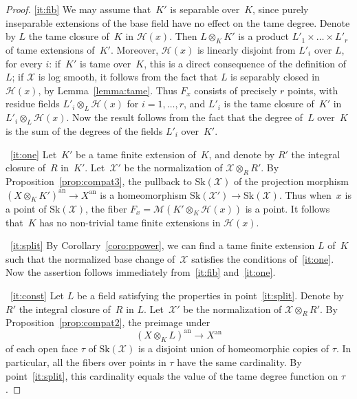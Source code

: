 \documentclass[JEP,XML,SOM,Unicode,NoFloatCountersInSection]{cedram}
\let\mathcal\mathscr
\theoremstyle{definition}
\numberwithin{equation}{subsection}
\newcommand{\cX}{\ensuremath{\mathscr{X}}}
\newcommand{\an}{\mathrm{an}}
\newcommand{\Sk}{\mathrm{Sk}}
\newcommand{\tdeg}{\mathrm{tdeg}}
\begin{document}
\skpt
\begin{proof}
\eqref{it:fib} We may assume that~$K'$ is separable over~$K$, since purely inseparable extensions of the base field have no effect on the tame degree.
Denote by $L$ the tame closure of~$K$ in $\mathscr{H}(x)$. Then $L\otimes_K K'$ is a product $L'_1\times \ldots \times L'_r$ of tame extensions of~$K'$.
Moreover, $\mathscr{H}(x)$ is linearly disjoint from $L'_i$ over $L$, for every $i$: if~$K'$ is tame over~$K$, this is a direct consequence of the definition of $L$; if
$\cX$ is log smooth, it follows from the fact that $L$ is separably closed in $\mathscr{H}(x)$, by Lemma~\ref{lemma:tame}.
Thus $F_x$ consists of precisely $r$ points, with residue fields $L'_i\otimes_L \mathscr{H}(x)$ for $i=1,\ldots,r$, and $L'_i$ is the tame closure of~$K'$ in $L'_i\otimes_L \mathscr{H}(x)$. Now the result follows from the fact that the degree of~$L$ over~$K$ is the sum of the degrees of the fields $L'_i$ over~$K'$.

~\eqref{it:one} Let~$K'$ be a tame finite extension of~$K$, and denote by $R'$ the integral closure of~$R$ in~$K'$. Let~$\cX'$ be the normalization of $\cX\otimes_R R'$.
By Proposition~\ref{prop:compat3}, the pullback to $\Sk(\cX)$ of the projection morphism $(X\otimes_K K')^{\an}\to X^{\an}$ is a homeomorphism
$\Sk(\cX')\to \Sk(\cX)$. Thus when~$x$ is a point of $\Sk(\cX)$, the fiber $F_x=\mathcal{M}(K'\otimes_K \mathscr{H}(x))$ is a point.
It follows that~$K$ has no non-trivial tame finite extensions in $\mathscr{H}(x)$.

~\eqref{it:split}
By Corollary~\ref{coro:ppower}, we can find a tame finite extension $L$ of~$K$ such that the normalized base change of~$\cX$ satisfies the conditions of~\eqref{it:one}. Now the assertion
follows immediately from~\eqref{it:fib} and~\eqref{it:one}.

~\eqref{it:const} Let $L$ be a field satisfying the properties in point~\eqref{it:split}.
Denote by $R'$ the integral closure of~$R$ in $L$. Let~$\cX'$ be the normalization of $\cX\otimes_R R'$. By Proposition~\ref{prop:compat2}, the preimage under
\[
(X\otimes_K L)^{\an}\to X^{\an}
\]
of each open face $\tau$ of $\Sk(\cX)$ is a disjoint union of homeomorphic copies of $\tau$. In particular, all the fibers over points in $\tau$ have the same cardinality. By point~\eqref{it:split}, this cardinality equals the value of the tame degree function on $\tau$.
\end{proof}
\end{document}
